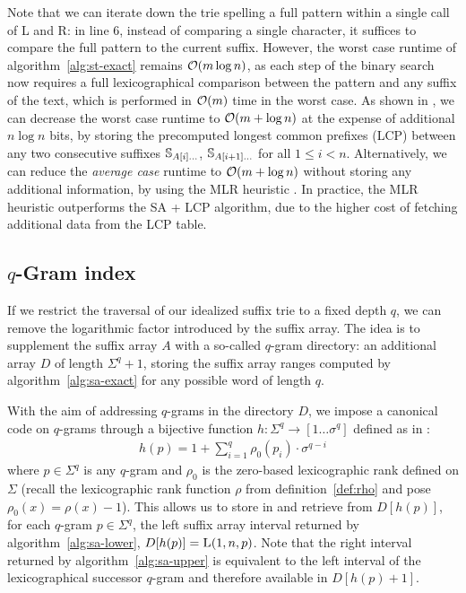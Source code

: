 Note that we can iterate down the trie spelling a full pattern within a single call of \textsc{L} and \textsc{R}: in line 6, instead of comparing a single character, it suffices to compare the full pattern to the current suffix.
However, the worst case runtime of algorithm~\ref{alg:st-exact} remains $\mathcal{O}(m \log{n})$, as each step of the binary search now requires a full lexicographical comparison between the pattern and any suffix of the text, which is performed in $\mathcal{O}(m)$ time in the worst case.
As shown in \citep{Manber1990}, we can decrease the worst case runtime to $\mathcal{O}(m + \log{n})$ at the expense of additional $n \log{n}$ bits, by storing the precomputed longest common prefixes (LCP) between any two consecutive suffixes $\mathbb {S}_{A[i] \dots}$, $\mathbb {S}_{A[i+1] \dots}$ for all $1 \leq i < n$.
Alternatively, we can reduce the \emph{average case} runtime to $\mathcal{O}(m + \log{n})$ without storing any additional information, by using the MLR heuristic \citep{Manber1990}.
In practice, the MLR heuristic outperforms the SA + LCP algorithm, due to the higher cost of fetching additional data from the LCP table.


\subsection{$q$-Gram index}

If we restrict the traversal of our idealized suffix trie to a fixed depth $q$, we can remove the logarithmic factor introduced by the suffix array.
The idea is to supplement the suffix array $A$ with a so-called $q$-gram directory: an additional array $D$ of length $\Sigma^q + 1$, storing the suffix array ranges computed by algorithm~\ref{alg:sa-exact} for any possible word of length $q$.

With the aim of addressing $q$-grams in the directory $D$, we impose a canonical code on $q$-grams through a bijective function $h : \Sigma^q \rightarrow [1 \dots \sigma^q]$ defined as in \citep{Knuth1973}:
\begin{eqnarray}
h(p) = 1 + \sum_{i=1}^{q}{\rho_0(p_i) \cdot \sigma^{q-i}}
\end{eqnarray}
where $p \in \Sigma^q$ is any $q$-gram and $\rho_0$ is the zero-based lexicographic rank defined on $\Sigma$ (recall the lexicographic rank function $\rho$ from definition~\ref{def:rho} and pose $\rho_0(x) = \rho(x) - 1$).
This allows us to store in and retrieve from $D[h(p)]$, for each $q$-gram $p \in \Sigma^q$, the left suffix array interval returned by algorithm~\ref{alg:sa-lower}, \ie $D[h(p)] = \textsc{L}(1,n,p)$.
Note that the right interval returned by algorithm~\ref{alg:sa-upper} is equivalent to the left interval of the lexicographical successor $q$-gram and therefore available in $D[h(p)+1]$.

